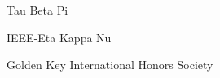 
\begin{cvskills}

  \cvskill
    {Tau Beta Pi} %
    {} %
    

    
      \cvskill
    {IEEE-Eta Kappa Nu} %
    {} %
    
          \cvskill
    {Golden Key International Honors Society} %
    {} %


\end{cvskills}
